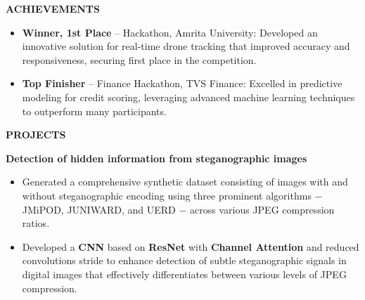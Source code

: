 \documentclass[10pt,a4]{article}
\begin{document}
{\begin{flushleft}
        

\end{flushleft}


\begin{flushleft}
        {\Large \textbf{ACHIEVEMENTS}}
          \vspace{1.5mm}
          \begin{itemize}
              \item \textbf{Winner, 1st Place} – Hackathon, Amrita University: Developed an innovative solution for real-time drone tracking that improved accuracy and responsiveness, securing first place in the competition.
              \item \textbf{Top Finisher} – Finance Hackathon, TVS Finance: Excelled in predictive modeling for credit scoring, leveraging advanced machine learning techniques to outperform many participants.
          \end{itemize}

\end{flushleft}

\begin{flushleft}
    {\Large \textbf{PROJECTS}}
    \vspace{1mm}
    \item \textbf{\large Detection of hidden information from steganographic images}
        \vspace{0.5mm}
        \begin{itemize}
            \item Generated a comprehensive synthetic dataset consisting of images with and without steganographic encoding using three prominent algorithms $-$ JMiPOD, JUNIWARD, and UERD $-$ across various JPEG compression ratios.
            \item Developed a \textbf{CNN} based on \textbf{ResNet} with \textbf{Channel Attention} and reduced convolutions stride to enhance detection of subtle steganographic signals in digital images that effectively differentiates between various levels of JPEG compression.
            

\end{itemize}
\end{flushleft}}
\end{document}

